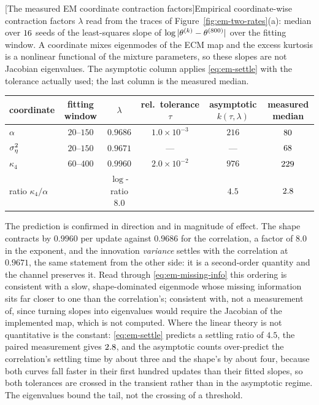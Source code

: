 \begin{center}
\begin{minipage}{\linewidth}\centering
{}[The measured EM coordinate contraction factors]{Empirical
coordinate-wise contraction factors $\lambda$ read from the traces of
Figure~\ref{fig:em-two-rates}(a): median over $16$ seeds of the
least-squares slope of $\log|\theta^{(k)}-\theta^{(800)}|$ over the
fitting window. A coordinate mixes eigenmodes of the ECM map and the excess
kurtosis is a nonlinear functional of the mixture parameters, so these slopes
are not Jacobian eigenvalues. The asymptotic column applies
\eqref{eq:em-settle} with the tolerance actually used; the last column is the
measured median.}
\label{tab:em-rates}
\small
\setlength{\tabcolsep}{4pt}
\begin{tabular}{@{}lccccc@{}}
\toprule
coordinate & fitting window & $\lambda$ & rel.\ tolerance $\tau$
  & asymptotic $k(\tau,\lambda)$ & measured median \\
\midrule
$\alpha$          & $20$--$150$ & $0.9686$ & $1.0\times10^{-3}$ & $216$  & $80$ \\
$\sigma_\eta^2$           & $20$--$150$ & $0.9671$ & ---                & ---    & $68$ \\
$\kappa_4$        & $60$--$400$ & $0.9960$ & $2.0\times10^{-2}$ & $976$  & $229$ \\
\midrule
ratio $\kappa_4 / \alpha$ & & $\log$-ratio $8.0$ & & $4.5$ & $2.8$ \\
\bottomrule
\end{tabular}
\end{minipage}
\end{center}

The prediction is confirmed in direction and in magnitude of effect. The
shape contracts by $0.9960$ per update against $0.9686$ for the correlation,
a factor of $8.0$ in the exponent, and the innovation \emph{variance} settles
with the correlation at $0.9671$, the same statement from the other side: it
is a second-order quantity and the channel preserves it. Read through
\eqref{eq:em-missing-info} this ordering is consistent with a slow,
shape-dominated eigenmode whose missing information sits far closer to one
than the correlation's; consistent with, not a measurement of, since turning
slopes into eigenvalues would require the Jacobian of the implemented map,
which is not computed. Where the linear theory is not quantitative is the
constant: \eqref{eq:em-settle} predicts a settling ratio of $4.5$, the paired
measurement gives $2.8$, and the asymptotic counts over-predict the
correlation's settling time by about three and the shape's by about four,
because both curves
fall faster in their first hundred updates than their fitted slopes, so both
tolerances are crossed in the transient rather than in the asymptotic regime.
The eigenvalues bound the tail, not the crossing of a threshold.

